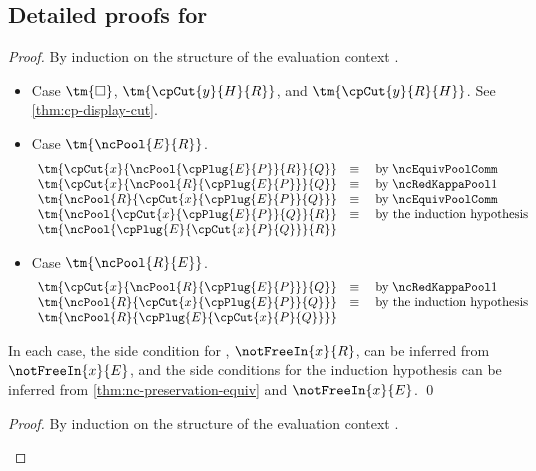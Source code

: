 \documentclass[UKenglish]{llncs}
\begin{document}
\begin{subappendices}
  \section{Detailed proofs for \nodcap}
  \thmncdisplaycut
  \begin{proof}
    By induction on the structure of the evaluation context .
    \begin{itemize}
    \item
      Case $\tm{\Box}$, $\tm{\cpCut{y}{H}{R}}$, and $\tm{\cpCut{y}{R}{H}}$. See
      \cref{thm:cp-display-cut}.
    \item
      Case $\tm{\ncPool{E}{R}}$.
      \[\!
        \begin{array}{ll}
          \tm{\cpCut{x}{\ncPool{\cpPlug{E}{P}}{R}}{Q}}
          & \equiv \quad \text{by} \; \ncEquivPoolComm \\
          \tm{\cpCut{x}{\ncPool{R}{\cpPlug{E}{P}}}{Q}}
          & \equiv \quad \text{by} \; \ncRedKappaPool1 \\
          \tm{\ncPool{R}{\cpCut{x}{\cpPlug{E}{P}}{Q}}}
          & \equiv \quad \text{by} \; \ncEquivPoolComm \\
          \tm{\ncPool{\cpCut{x}{\cpPlug{E}{P}}{Q}}{R}}
          & \equiv \quad \text{by the induction hypothesis}\\
          \tm{\ncPool{\cpPlug{E}{\cpCut{x}{P}{Q}}}{R}}
        \end{array}
      \]
    \item
      Case $\tm{\ncPool{R}{E}}$.
      \[\!
        \begin{array}{ll}
          \tm{\cpCut{x}{\ncPool{R}{\cpPlug{E}{P}}}{Q}}
          & \equiv \quad \text{by} \; \ncRedKappaPool1 \\
          \tm{\ncPool{R}{\cpCut{x}{\cpPlug{E}{P}}{Q}}}
          & \equiv \quad \text{by the induction hypothesis}\\
          \tm{\ncPool{R}{\cpPlug{E}{\cpCut{x}{P}{Q}}}}
        \end{array}
      \]
    \end{itemize}
    In each case, the side condition for , $\notFreeIn{x}{R}$,
    can be inferred from $\notFreeIn{x}{E}$, and the side conditions for the
    induction hypothesis can be inferred from \cref{thm:nc-preservation-equiv}
    and $\notFreeIn{x}{E}$.
    \qed
  \end{proof}
  \thmncdisplaypool
  \begin{proof}
    By induction on the structure of the evaluation context .
    \begin{itemize}

\end{itemize}
\end{proof}
\end{subappendices}
\end{document}
